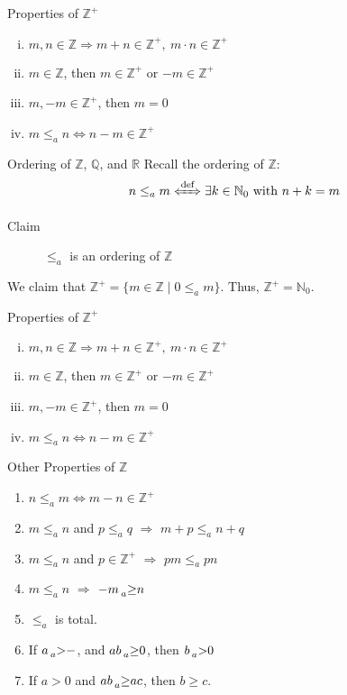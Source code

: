 \documentclass[8pt]{extarticle}
\newcommand{\N}{\mathbb{N}}
\newcommand{\Q}{\mathbb{Q}}
\newcommand{\Z}{\mathbb{Z}}
\newcommand{\R}{\mathbb{R}}
\begin{document}
  \begin{problem}{Properties of $\Z^+$}
    \begin{enumerate}[(i)]
      \item $m,n\in \Z\Rightarrow m+n\in\Z^+,~m\cdot n\in \Z^+$
      \item $m\in \Z$, then $m\in \Z^+$ or $-m\in\Z^+$
      \item $m,-m\in \Z^+$, then $m=0$
      \item $m\leq_a n \Leftrightarrow n-m\in\Z^+$
    \end{enumerate}
  \end{problem}
  \begin{problem}{Ordering of $\Z$, $\Q$, and $\R$}
    Recall the ordering of $\Z$:
    \[
      n\leq_a m \xLeftrightarrow{\text{def}} \exists k\in \N_0~\text{with } n+k=m
    \] 
    \begin{description}
      \item[Claim] $\leq_a$ is an ordering of $\Z$
    \end{description}
    We claim that $\Z^+ = \{m\in\Z\mid 0\leq_a m\}$. Thus, $\Z^+ = \N_0$.
    \begin{problem}{Properties of $\Z^+$}
      \begin{enumerate}[(i)]
        \item $m,n\in \Z\Rightarrow m+n\in\Z^+,~m\cdot n\in \Z^+$
        \item $m\in \Z$, then $m\in \Z^+$ or $-m\in\Z^+$
        \item $m,-m\in \Z^+$, then $m=0$
        \item $m\leq_a n \Leftrightarrow n-m\in\Z^+$
      \end{enumerate}
    \end{problem}
    \begin{problem}{Other Properties of $\Z$}
      \begin{enumerate}[(\arabic*)]
        \item $n\leq_a m\Leftrightarrow m-n\in\Z^+$
        \item $m\leq_a n$ and $p\leq_a q$ $\Rightarrow$ $m+p \leq_a n+q$
        \item $m\leq_a n$ and $p\in \Z^+$ $\Rightarrow$ $pm\leq_a pn$
        \item $m\leq_a n$ $\Rightarrow$ $-m \prescript{}{a}\geq n$
        \item $\leq_a$ is total.
        \item If $a \prescript{}{a}>-$, and $ab \prescript{}{a}\geq 0$, then $b\prescript{}{a}>0$
        \item If $a > 0$ and $ab \prescript{}{a}\geq ac$, then $b\geq c$.

\end{enumerate}
\end{problem}
\end{problem}
\end{document}
